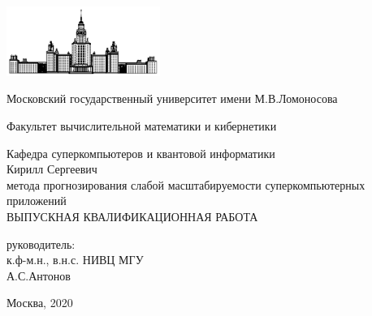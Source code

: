 \begin{titlepage}
	\begin{center}
		\includegraphics[width=50mm]{./images/MSU}

	    Московский государственный университет имени М.В.Ломоносова

	    Факультет вычислительной математики и кибернетики

	    Кафедра суперкомпьютеров и квантовой информатики\\[20mm]

	    { Кирилл Сергеевич}\\[5mm]

	    \textsf{\Large{} метода прогнозирования слабой масштабируемости суперкомпьютерных приложений}\\[15mm]
	    {ВЫПУСКНАЯ КВАЛИФИКАЦИОННАЯ РАБОТА}\\[35mm]
	       
	    

	    \begin{flushright}
	            { руководитель:}\\
	            к.ф-м.н., в.н.с. НИВЦ МГУ\\
	            А.С.Антонов
	    \end{flushright}

	    \vspace{\fill}
	    Москва, 2020
	\end{center}
\end{titlepage}

\clearpage
